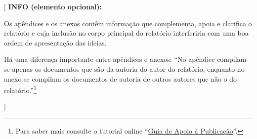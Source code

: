 \documentclass[11pt,a4paper]{report}
\newenvironment{infoopt}[1]{\vspace*{6mm}\color{blue}[ \textbf{INFO (elemento opcional):} \begin{em} #1}
                        {\vspace*{3mm}\end{em} ]}
\begin{document}
\begin{infoopt}
Os apêndices e os anexos contêm informação que complementa, apoia e
clarifica o relatório e cuja inclusão no corpo principal do relatório
interferiria com uma boa ordem de apresentação das ideias.

Há uma diferença importante entre apêndices e anexos: ``No apêndice
compilam-se apenas os documentos que são da autoria do autor do
relatório, enquanto no anexo se compilam os documentos de autoria de
outros autores que não o do relatório.''\footnote{%
Para saber mais consulte o tutorial online 
``\href{https://docs.google.com/document/d/1TDC1behVq8x7fQL4CcPEEh_np5GXviJevQxnQ9gbiJs/edit}
{Guia de Apoio à Publicação}''.}
\end{infoopt}

\end{document}
